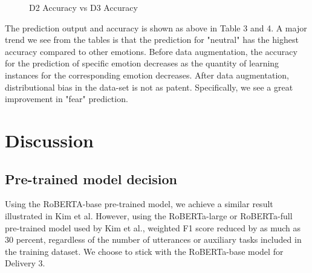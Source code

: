 \documentclass[11pt]{article}
\begin{document}
\begin{figure}
\caption{D2 Accuracy vs D3 Accuracy}
\label{fig:stats}
\end{figure}


The prediction output and accuracy is shown as above in Table 3 and 4. A major trend we see from the tables is that the prediction for "neutral" has the highest accuracy compared to other emotions. Before data augmentation, the accuracy for the prediction of specific emotion decreases as the quantity of learning instances for the corresponding emotion decreases. After data augmentation, distributional bias in the data-set is not as patent. Specifically, we see a great improvement in "fear" prediction.

\section{Discussion}

\subsection{Pre-trained model decision}

Using the RoBERTA-base pre-trained model, we achieve a similar result illustrated in Kim et al. However, using the RoBERTa-large or RoBERTa-full pre-trained model used by Kim et al., weighted F1 score reduced by as much as 30 percent, regardless of the number of utterances or auxiliary tasks included in the training dataset. We choose to stick with the RoBERTa-base model for Delivery 3.
\end{document}
